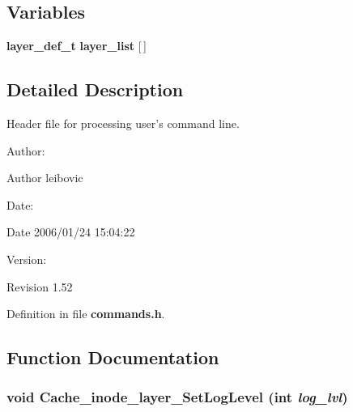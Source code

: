 \subsection*{Variables}
\begin{CompactItemize}
\item 
{\bf layer\_\-def\_\-t} {\bf layer\_\-list} [$\,$]
\end{CompactItemize}


\subsection{Detailed Description}
Header file for processing user's command line. 

\begin{Desc}
\item[Author:]\end{Desc}
\begin{Desc}
\item[Author]leibovic \end{Desc}
\begin{Desc}
\item[Date:]\end{Desc}
\begin{Desc}
\item[Date]2006/01/24 15:04:22 \end{Desc}
\begin{Desc}
\item[Version:]\end{Desc}
\begin{Desc}
\item[Revision]1.52 \end{Desc}


Definition in file {\bf commands.h}.

\subsection{Function Documentation}
\subsubsection[{Cache\_\-inode\_\-layer\_\-SetLogLevel}]{\setlength{\rightskip}{0pt plus 5cm}void Cache\_\-inode\_\-layer\_\-SetLogLevel (int {\em log\_\-lvl})}\label{commands_8h_7440aeb3677f16a9616c85a5c6734c53}





